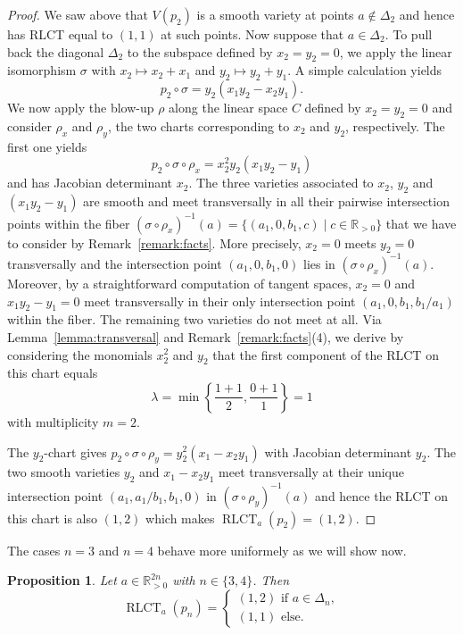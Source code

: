 \documentclass[11pt]{amsart}
\DeclareMathOperator{\rlct}{RLCT}
\numberwithin{equation}{section}
\theoremstyle{plain}
\newtheorem{proposition}[theorem]{Proposition}
\theoremstyle{definition}
\newcommand{\R}{\mathbb{R}}
\newcommand{\gt}{>}
\begin{document}
\begin{proof}
    We saw above that $V(p_2)$ is a smooth variety at points $a \notin \Delta_2$ and hence has RLCT equal to $(1,1)$ at such points.
    Now suppose that $a \in \Delta_2$.
    To pull back the diagonal $\Delta_2$ to the subspace defined by $x_2= y_2 = 0$, we apply the linear isomorphism $\sigma$ with $x_2 \mapsto x_2 + x_1$ and $y_2 \mapsto y_2 + y_1$. A simple calculation yields
    \[
    p_2 \circ \sigma =y_2( x_{1}y_{2} -x_{2}y_{1}).
    \]
    We now apply the blow-up $\rho$ along the linear space $C$ defined by $x_2 = y_2 = 0$ and consider $\rho_x$ and $\rho_y$, the two charts corresponding to $x_2$ and $y_2$, respectively. The first one yields
    \[
    p_2 \circ \sigma \circ \rho_x = x_2^2y_2(x_1y_2 - y_1)
    \]
    and has Jacobian determinant $x_2$. The three varieties associated to $x_2$, $y_2$ and $(x_1y_2 - y_1)$ are smooth and meet transversally in all their pairwise intersection points within the fiber $(\sigma \circ \rho_x)^{-1}(a) = \{(a_1,0,b_1,c)  \mid c \in \R_{\gt 0}\}$ that we have to consider by Remark~\ref{remark:facts}. More precisely, $x_2 = 0$ meets $y_2 = 0$ transversally and the intersection point $(a_1,0,b_1,0)$ lies in $(\sigma \circ \rho_x)^{-1}(a)$. Moreover, by a straightforward computation of tangent spaces, $x_2 = 0$ and  $x_1y_2 - y_1 = 0$ meet transversally in their only intersection point $(a_1,0,b_1,b_1/a_1)$ within the fiber. The remaining two varieties do not meet at all. Via Lemma~\ref{lemma:transversal} and Remark~\ref{remark:facts}(4), we derive by considering the monomials $x_2^2$ and $y_2$ that the first component of the RLCT on this chart equals
\[
\lambda = \min \left\{ \frac{1+1}{2}, \frac{0+1}{1}\right\} = 1
\]
with multiplicity $m = 2$.

The $y_2$-chart gives $p_2 \circ \sigma \circ \rho_y = y_2^2(x_1-x_2y_1)$ with Jacobian determinant $y_2$. The two smooth varieties $y_2$ and $x_1-x_2y_1$ meet transversally at their unique intersection point $(a_1,a_1/b_1,b_1,0)$ in $(\sigma \circ \rho_y)^{-1}(a)$ and hence the RLCT on this chart is also $(1,2)$ which makes $\rlct_a(p_2) = (1,2)$.
\end{proof}

The cases $n = 3$ and $n = 4$ behave more uniformely as we will show now.

\begin{proposition}\label{prop:petroln}
    Let $a \in \R_{\gt 0}^{2n}$ with $n \in \{3,4\}$. Then
    \[
    \rlct_a(p_n) = \begin{cases}
        (1,2) \text{ if } a \in \Delta_n, \\
        (1,1) \text{ else}.
    \end{cases}
    \]
\end{proposition}
\end{document}
